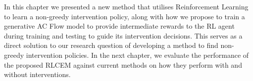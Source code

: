 In this chapter we presented a new method 
that utilises Reinforcement Learning
to learn a non-greedy intervention policy,
along with how we propose 
to train a generative AC Flow model to
provide intermediate rewards to the RL agent during
training and testing to guide its intervention decisions.
This serves as a direct solution to our research question of 
developing a method to find non-greedy intervention policies.
In the next chapter, we evaluate the performance of the proposed
RLCEM against current methods on how
they perform with and without interventions.


